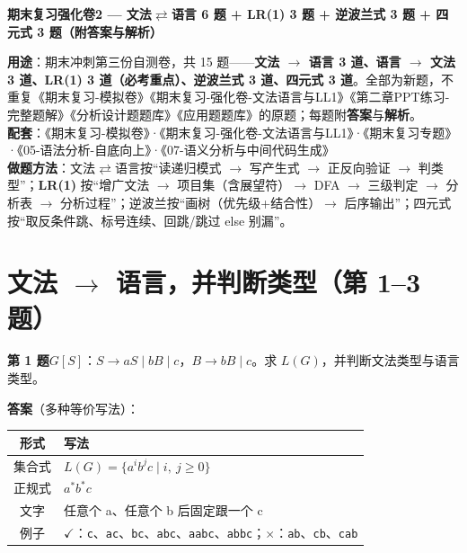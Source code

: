 \documentclass[12pt,a4paper,fontset=windows]{ctexart}
\newcommand{\ok}{\ensuremath{\checkmark}}
\newcommand{\bad}{\ensuremath{\times}}
\begin{document}
\begin{center}
{\LARGE\bfseries 期末复习强化卷2 — 文法$\rightleftarrows$语言 6 题 + LR(1) 3 题 + 逆波兰式 3 题 + 四元式 3 题（附答案与解析）}
\end{center}

\begin{infobox}
\textbf{用途}：期末冲刺第三份自测卷，共 15 题——\textbf{文法 $\to$ 语言 3 道、语言 $\to$ 文法 3 道、LR(1) 3 道（必考重点）、逆波兰式 3 道、四元式 3 道}。全部为新题，不重复《期末复习-模拟卷》《期末复习-强化卷-文法语言与LL1》《第二章PPT练习-完整题解》《分析设计题题库》《应用题题库》的原题；每题附\textbf{答案}与\textbf{解析}。\\
\textbf{配套}：《期末复习-模拟卷》·《期末复习-强化卷-文法语言与LL1》·《期末复习专题》·《05-语法分析-自底向上》·《07-语义分析与中间代码生成》\\
\textbf{做题方法}：文法$\rightleftarrows$语言按``读递归模式 $\to$ 写产生式 $\to$ 正反向验证 $\to$ 判类型''；\textbf{LR(1)} 按``增广文法 $\to$ 项目集（含展望符）$\to$ DFA $\to$ 三级判定 $\to$ 分析表 $\to$ 分析过程''；逆波兰按``画树（优先级+结合性）$\to$ 后序输出''；四元式按``取反条件跳、标号连续、回跳/跳过 else 别漏''。
\end{infobox}

\section{\texorpdfstring{文法 $\to$ 语言，并判断类型（第 1--3 题）}{文法→语言，并判断类型（第 1–3 题）}}

\begin{qbox}
{\large\bfseries 第 1 题}\quad $G[S]$：$S \to aS \mid bB \mid c$，$B \to bB \mid c$。求 $L(G)$，并判断文法类型与语言类型。
\end{qbox}

\textbf{答案}（多种等价写法）：

\begin{center}
\renewcommand{\arraystretch}{1.25}
\begin{tabular}{c p{11.2cm}}
\toprule
\textbf{形式} & \textbf{写法} \\
\midrule
集合式 & $L(G)=\{a^i b^j c \mid i,\ j \ge 0\}$ \\
正规式 & $a^* b^* c$ \\
文字 & 任意个 a、任意个 b 后固定跟一个 c \\
例子 & \ok：\texttt{c}、\texttt{ac}、\texttt{bc}、\texttt{abc}、\texttt{aabc}、\texttt{abbc}；\bad：\texttt{ab}、\texttt{cb}、\texttt{cab} \\
\bottomrule
\end{tabular}
\end{center}
\end{document}
